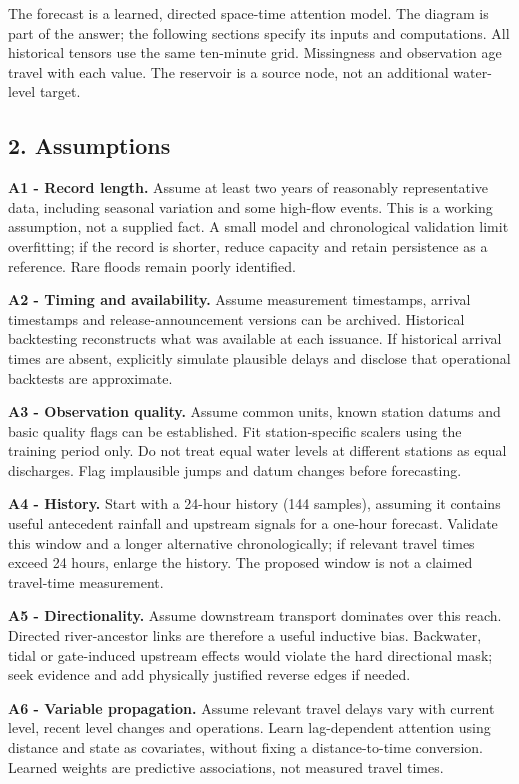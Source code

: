 \documentclass[
  10pt,
  a4paper,
]{article}
\begin{document}
The forecast is a learned, directed space-time attention model. The
diagram is part of the answer; the following sections specify its inputs
and computations. All historical tensors use the same ten-minute grid.
Missingness and observation age travel with each value. The reservoir is
a source node, not an additional water-level target.

\subsection{2. Assumptions}\label{assumptions}

\textbf{A1 - Record length.} Assume at least two years of reasonably
representative data, including seasonal variation and some high-flow
events. This is a working assumption, not a supplied fact. A small model
and chronological validation limit overfitting; if the record is
shorter, reduce capacity and retain persistence as a reference. Rare
floods remain poorly identified.

\textbf{A2 - Timing and availability.} Assume measurement timestamps,
arrival timestamps and release-announcement versions can be archived.
Historical backtesting reconstructs what was available at each issuance.
If historical arrival times are absent, explicitly simulate plausible
delays and disclose that operational backtests are approximate.

\textbf{A3 - Observation quality.} Assume common units, known station
datums and basic quality flags can be established. Fit station-specific
scalers using the training period only. Do not treat equal water levels
at different stations as equal discharges. Flag implausible jumps and
datum changes before forecasting.

\textbf{A4 - History.} Start with a 24-hour history (144 samples),
assuming it contains useful antecedent rainfall and upstream signals for
a one-hour forecast. Validate this window and a longer alternative
chronologically; if relevant travel times exceed 24 hours, enlarge the
history. The proposed window is not a claimed travel-time measurement.

\textbf{A5 - Directionality.} Assume downstream transport dominates over
this reach. Directed river-ancestor links are therefore a useful
inductive bias. Backwater, tidal or gate-induced upstream effects would
violate the hard directional mask; seek evidence and add physically
justified reverse edges if needed.

\textbf{A6 - Variable propagation.} Assume relevant travel delays vary
with current level, recent level changes and operations. Learn
lag-dependent attention using distance and state as covariates, without
fixing a distance-to-time conversion. Learned weights are predictive
associations, not measured travel times.
\end{document}
